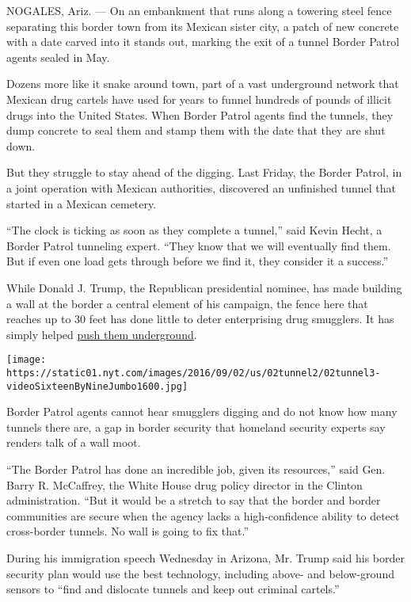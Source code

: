 NOGALES, Ariz. --- On an embankment that runs along a towering steel
fence separating this border town from its Mexican sister city, a patch
of new concrete with a date carved into it stands out, marking the exit
of a tunnel Border Patrol agents sealed in May.

Dozens more like it snake around town, part of a vast underground
network that Mexican drug cartels have used for years to funnel hundreds
of pounds of illicit drugs into the United States. When Border Patrol
agents find the tunnels, they dump concrete to seal them and stamp them
with the date that they are shut down.

But they struggle to stay ahead of the digging. Last Friday, the Border
Patrol, in a joint operation with Mexican authorities, discovered an
unfinished tunnel that started in a Mexican cemetery.

``The clock is ticking as soon as they complete a tunnel,'' said Kevin
Hecht, a Border Patrol tunneling expert. ``They know that we will
eventually find them. But if even one load gets through before we find
it, they consider it a success.''

While Donald J. Trump, the Republican presidential nominee, has made
building a wall at the border a central element of his campaign, the
fence here that reaches up to 30 feet has done little to deter
enterprising drug smugglers. It has simply helped
\href{http://www.nytimes.com/2010/10/03/us/03tunnels.html}{push them
underground}.

\texttt{[image: https://static01.nyt.com/images/2016/09/02/us/02tunnel2/02tunnel3-videoSixteenByNineJumbo1600.jpg]}

Border Patrol agents cannot hear smugglers digging and do not know how
many tunnels there are, a gap in border security that homeland security
experts say renders talk of a wall moot.

``The Border Patrol has done an incredible job, given its resources,''
said Gen. Barry R. McCaffrey, the White House drug policy director in
the Clinton administration. ``But it would be a stretch to say that the
border and border communities are secure when the agency lacks a
high-confidence ability to detect cross-border tunnels. No wall is going
to fix that.''

During his immigration speech Wednesday in Arizona, Mr. Trump said his
border security plan would use the best technology, including above- and
below-ground sensors to ``find and dislocate tunnels and keep out
criminal cartels.''

